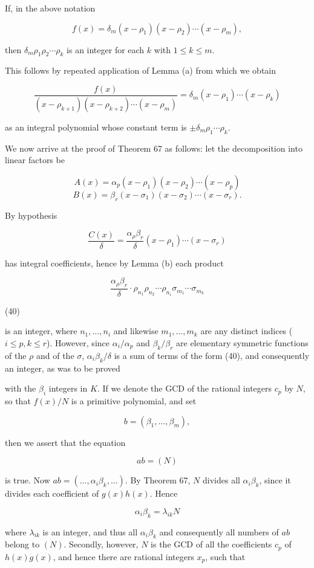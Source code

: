 If, in the above notation

$$f(x) = \delta_m(x - \rho_1)(x - \rho_2) \cdots (x - \rho_m),$$

then $\delta_m\rho_1\rho_2 \cdots \rho_k$ is an integer for each $k$ with $1 \leq k \leq m$.

This follows by repeated application of Lemma (a) from which we obtain

$$\frac{f(x)}{(x - \rho_{k+1})(x - \rho_{k+2}) \cdots (x - \rho_m)} = \delta_m(x - \rho_1) \cdots (x - \rho_k)$$

as an integral polynomial whose constant term is $\pm \delta_m\rho_1 \cdots \rho_k$.

We now arrive at the proof of Theorem 67 as follows: let the decomposition into linear factors be

$$A(x) = \alpha_p(x - \rho_1)(x - \rho_2) \cdots (x - \rho_p)$$
$$B(x) = \beta_r(x - \sigma_1)(x - \sigma_2) \cdots (x - \sigma_r).$$

By hypothesis

$$\frac{C(x)}{\delta} = \frac{\alpha_\rho \beta_r}{\delta}(x - \rho_1) \cdots (x - \sigma_r)$$

has integral coefficients, hence by Lemma (b) each product

$$\frac{\alpha_\rho \beta_r}{\delta} \cdot \rho_{n_1} \rho_{n_2} \cdots \rho_{n_i} \sigma_{m_1} \cdots \sigma_{m_k}$$

(40)

is an integer, where $n_1, \ldots, n_i$ and likewise $m_1, \ldots, m_k$ are any distinct indices ($i \leq p, k \leq r$). However, since $\alpha_i/\alpha_p$ and $\beta_k/\beta_r$ are elementary symmetric functions of the $\rho$ and of the $\sigma$, $\alpha_i\beta_k/\delta$ is a sum of terms of the form (40), and consequently an integer, as was to be proved

with the $\beta_i$ integers in $K$. If we denote the GCD of the rational integers $c_p$ by $N$, so that $f(x)/N$ is a primitive polynomial, and set

$$b = (\beta_1, \ldots, \beta_m),$$

then we assert that the equation

$$ab = (N)$$

is true. Now $ab = (\ldots, \alpha_i \beta_k, \ldots)$. By Theorem 67, $N$ divides all $\alpha_i \beta_k$, since it divides each coefficient of $g(x)h(x)$. Hence

$$\alpha_i \beta_k = \lambda_{ik} N$$

where $\lambda_{ik}$ is an integer, and thus all $\alpha_i \beta_k$ and consequently all numbers of $ab$ belong to $(N)$. Secondly, however, $N$ is the GCD of all the coefficients $c_p$ of $h(x)g(x)$, and hence there are rational integers $x_p$, such that


